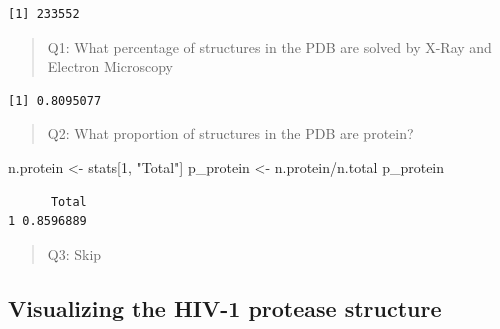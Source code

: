\documentclass[
  letterpaper,
  DIV=11,
  numbers=noendperiod]{scrartcl}
\newenvironment{Shaded}{\begin{snugshade}}{\end{snugshade}}
\newcommand{\AttributeTok}[1]{\textcolor[rgb]{0.40,0.45,0.13}{#1}}
\newcommand{\CommentTok}[1]{\textcolor[rgb]{0.37,0.37,0.37}{#1}}
\newcommand{\DecValTok}[1]{\textcolor[rgb]{0.68,0.00,0.00}{#1}}
\newcommand{\FunctionTok}[1]{\textcolor[rgb]{0.28,0.35,0.67}{#1}}
\newcommand{\NormalTok}[1]{\textcolor[rgb]{0.00,0.23,0.31}{#1}}
\newcommand{\OtherTok}[1]{\textcolor[rgb]{0.00,0.23,0.31}{#1}}
\newcommand{\SpecialCharTok}[1]{\textcolor[rgb]{0.37,0.37,0.37}{#1}}
\newcommand{\StringTok}[1]{\textcolor[rgb]{0.13,0.47,0.30}{#1}}
\begin{document}
\begin{verbatim}
[1] 233552
\end{verbatim}

\begin{quote}
Q1: What percentage of structures in the PDB are solved by X-Ray and
Electron Microscopy
\end{quote}

\begin{Shaded}
\end{Shaded}

\begin{verbatim}
[1] 0.8095077
\end{verbatim}

\begin{quote}
Q2: What proportion of structures in the PDB are protein?
\end{quote}

\begin{Shaded}
\begin{Highlighting}[]
\NormalTok{n.protein }\OtherTok{\textless{}{-}}\NormalTok{ stats[}\DecValTok{1}\NormalTok{, }\StringTok{"Total"}\NormalTok{]}
\NormalTok{p\_protein }\OtherTok{\textless{}{-}}\NormalTok{ n.protein}\SpecialCharTok{/}\NormalTok{n.total}
\NormalTok{p\_protein}
\end{Highlighting}
\end{Shaded}

\begin{verbatim}
      Total
1 0.8596889
\end{verbatim}

\begin{quote}
Q3: Skip
\end{quote}

\subsection{Visualizing the HIV-1 protease
structure}\label{visualizing-the-hiv-1-protease-structure}
\end{document}
